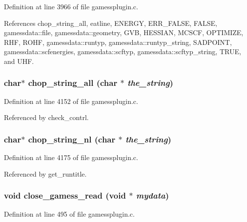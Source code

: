 Definition at line 3966 of file gamessplugin.c.

References chop\_\-string\_\-all, eatline, ENERGY, ERR\_\-FALSE, FALSE, gamessdata::file, gamessdata::geometry, GVB, HESSIAN, MCSCF, OPTIMIZE, RHF, ROHF, gamessdata::runtyp, gamessdata::runtyp\_\-string, SADPOINT, gamessdata::scfenergies, gamessdata::scftyp, gamessdata::scftyp\_\-string, TRUE, and UHF.
\subsubsection{\setlength{\rightskip}{0pt plus 5cm}char$\ast$ chop\_\-string\_\-all (char $\ast$ {\em the\_\-string})}\label{gamessplugin_8c_a38}




Definition at line 4152 of file gamessplugin.c.

Referenced by check\_\-contrl.
\subsubsection{\setlength{\rightskip}{0pt plus 5cm}char$\ast$ chop\_\-string\_\-nl (char $\ast$ {\em the\_\-string})}\label{gamessplugin_8c_a39}




Definition at line 4175 of file gamessplugin.c.

Referenced by get\_\-runtitle.
\subsubsection{\setlength{\rightskip}{0pt plus 5cm}void close\_\-gamess\_\-read (void $\ast$ {\em mydata})\hspace{0.3cm}{\tt  [static]}}\label{gamessplugin_8c_a9}




Definition at line 495 of file gamessplugin.c.

